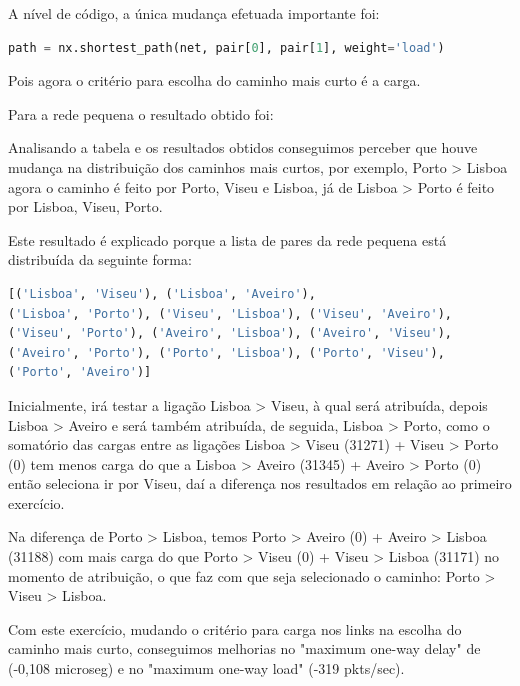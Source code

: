 \documentclass[pdftex,12pt,a4paper]{report}
\begin{document}
A nível de código, a única mudança efetuada importante foi:
\begin{lstlisting}[language=python]
path = nx.shortest_path(net, pair[0], pair[1], weight='load')
\end{lstlisting}

Pois agora o critério para escolha do caminho mais curto é a carga.

Para a rede pequena o resultado obtido foi:



Analisando a tabela e os resultados obtidos conseguimos perceber que houve mudança na distribuição dos caminhos mais curtos, por exemplo, Porto > Lisboa agora o caminho é feito por Porto, Viseu e Lisboa, já de Lisboa > Porto é feito por Lisboa, Viseu, Porto.

Este resultado é explicado porque a lista de pares da rede pequena está distribuída da seguinte forma:

\begin{lstlisting}[language=python]
[('Lisboa', 'Viseu'), ('Lisboa', 'Aveiro'),
('Lisboa', 'Porto'), ('Viseu', 'Lisboa'), ('Viseu', 'Aveiro'),
('Viseu', 'Porto'), ('Aveiro', 'Lisboa'), ('Aveiro', 'Viseu'), 
('Aveiro', 'Porto'), ('Porto', 'Lisboa'), ('Porto', 'Viseu'),
('Porto', 'Aveiro')]
\end{lstlisting}

Inicialmente, irá testar a ligação Lisboa > Viseu, à qual será atribuída, depois Lisboa > Aveiro e será também atribuída, de seguida, Lisboa > Porto, como o somatório das cargas entre as ligações Lisboa > Viseu (31271) + Viseu > Porto (0) tem menos carga do que a Lisboa > Aveiro (31345) + Aveiro > Porto (0) então seleciona ir por Viseu, daí a diferença nos resultados em relação ao primeiro exercício.
 
Na diferença de Porto > Lisboa, temos Porto > Aveiro (0)  + Aveiro > Lisboa (31188) com mais carga do que Porto > Viseu (0) + Viseu > Lisboa (31171) no momento de atribuição, o que faz com que seja selecionado o caminho: Porto > Viseu > Lisboa.





Com este exercício, mudando o critério para carga nos links na escolha do caminho mais curto, conseguimos melhorias no "maximum one-way delay" de (-0,108 microseg)   e no "maximum one-way load" (-319 pkts/sec). 

\end{document}
